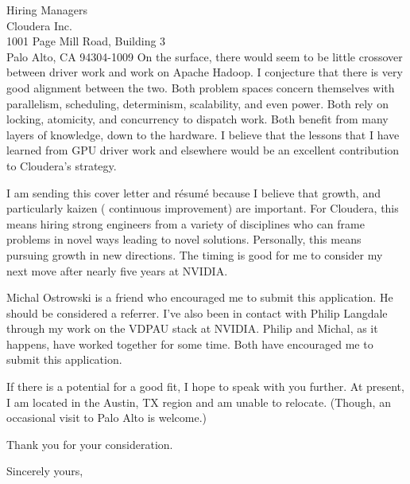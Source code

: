 \documentclass{letter} %
\begin{document}
\begin{letter}{Hiring Managers\\
Cloudera Inc.\\
1001 Page Mill Road, Building 3\\ 
Palo Alto, CA 94304-1009}
On the surface, there would seem to be little crossover between driver work
and work on Apache Hadoop. I conjecture that there is very good alignment
between the two. Both problem spaces concern themselves with parallelism,
scheduling, determinism, scalability, and even power. Both rely on locking,
atomicity, and concurrency to dispatch work. Both benefit from many layers
of knowledge, down to the hardware. I believe that the lessons that I have
learned from GPU driver work and elsewhere would be an excellent contribution
to Cloudera's strategy.
 

I am sending this cover letter and r\'esum\'e because I believe that
growth, and particularly kaizen (
continuous improvement) are important. For Cloudera, this means hiring
strong engineers from a variety of disciplines who can frame problems in
novel ways leading to novel solutions. Personally, this means pursuing
growth in new directions. The timing is good for me to consider my next
move after nearly five years at NVIDIA.

Michal Ostrowski is a friend who encouraged me to submit this application.
He should be considered a referrer. I've also been in contact with
Philip Langdale through my work on the VDPAU stack at NVIDIA. Philip and
Michal, as it happens, have worked together for some time. Both have
encouraged me to submit this application.

If there is a potential for a good fit, I hope to speak with you further.
At present, I am located in the Austin, TX region and am unable to relocate.
(Though, an occasional visit to Palo Alto is welcome.)

Thank you for your consideration.
 
\closing{Sincerely yours,} 
 

 

\end{letter}
 
\end{document}
